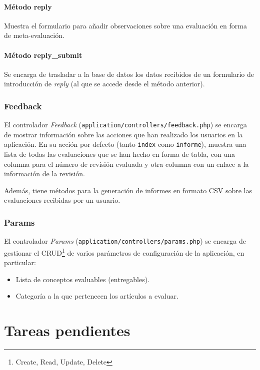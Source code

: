 \documentclass[11pt]{article}
\begin{document}
\paragraph{Método reply}

Muestra el formulario para añadir observaciones sobre una evaluación en forma de
meta-evaluación.

\paragraph{Método reply\_submit}

Se encarga de trasladar a la base de datos los datos recibidos de un formulario
de introducción de \textit{reply} (al que se accede desde el método anterior).

\subsubsection{Feedback}

El controlador \textit{Feedback} (\texttt{application/controllers/feedback.php})
se encarga de mostrar información sobre las acciones que han realizado los
usuarios en la aplicación. En su acción por defecto (tanto \texttt{index} como
\texttt{informe}), muestra una lista de todas las evaluaciones que se han hecho
en forma de tabla, con una columna para el número de revisión evaluada y otra
columna con un enlace a la información de la revisión.

Además, tiene métodos para la generación de informes en formato CSV sobre las
evaluaciones recibidas por un usuario.

\subsubsection{Params}

El controlador \textit{Params} (\texttt{application/controllers/params.php}) se
encarga de gestionar el CRUD\footnote{Create, Read, Update, Delete} de varios
parámetros de configuración de la aplicación, en particular:

\begin{itemize}
\item Lista de conceptos evaluables (entregables).
\item Categoría a la que pertenecen los artículos a evaluar.
\end{itemize}

\pagebreak

\section{Tareas pendientes}
\end{document}
